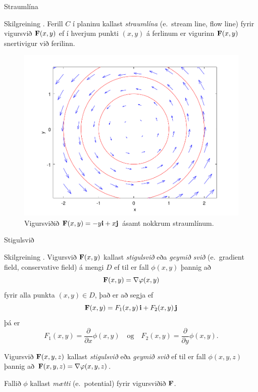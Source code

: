 \begin{frame}{Straumlína} 

\begin {block}{Skilgreining \kaflanr.}
 Ferill $C$ í planinu kallast {\em straumlína}
(e.~stream line, flow line)
fyrir vigursvið $\mbox{${\bf F}$}(x,y)$ ef í hverjum punkti $(x,y)$ á ferlinum er
vigurinn $\mbox{${\bf F}$}(x,y)$ snertivigur við ferilinn. 
\end{block}

 \begin {figure}[h!]
 \centering
            \includegraphics[width=0.55\linewidth]{flowlines}
            \caption*{ Vigursviðið $\mathbf{F}(x,y) = -y\mbox{${\bf i}$} + x \mbox{${\bf j}$}$ ásamt nokkrum straumlínum.}
\end {figure}

\end{frame}


\begin{frame}{Stigulsvið} 

\begin {block}{Skilgreining \kaflanr.}
Vigursvið $\mbox{${\bf F}$}(x,y)$ kallast {\em stigulsvið} eða {\em geymið svið}
(e.~gradient field, conservative  field) á mengi $D$ ef til er fall $\phi(x,y)$ þannig að $$\mbox{${\bf F}$}(x,y)=\nabla\varphi(x,y)$$ fyrir alla punkta $(x,y)\in D$, það er að segja ef 
$$\mbox{${\bf F}$}(x,y)=F_1(x,y)\,\mbox{${\bf i}$}+F_2(x,y)\,\mbox{${\bf j}$}$$ þá er $$F_1(x,y)=\frac{\partial}{\partial x}\phi(x,y) \quad \text{og}\quad  F_2(x,y)=\frac{\partial}{\partial y}\phi(x,y).$$

Vigursvið $\mbox{${\bf F}$}(x,y,z)$ kallast {\em stigulsvið} eða  {\em geymið svið} ef til er fall $\phi(x,y,z)$ þannig að $\mbox{${\bf F}$}(x,y,z)=\nabla\varphi(x,y,z)$. 

\medskip
Fallið $\phi$ kallast {\em mætti} (e.~potential) fyrir vigursviðið $\mbox{${\bf F}$}$.
\end{block}

\end{frame}



